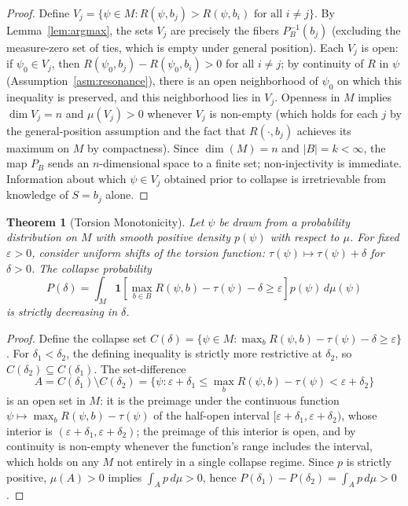 \documentclass[11pt]{article}
\theoremstyle{plain}
\newtheorem{theorem}{Theorem}[section]
\begin{document}
\begin{proof}
Define $V_j = \{\psi \in M : R(\psi, b_j) > R(\psi, b_i) \text{ for all } i \neq j\}$. By
Lemma~\ref{lem:argmax}, the sets $V_j$ are precisely the fibers $P_B^{-1}(b_j)$ (excluding the
measure-zero set of ties, which is empty under general position). Each $V_j$ is open: if
$\psi_0 \in V_j$, then $R(\psi_0, b_j) - R(\psi_0, b_i) > 0$ for all $i \neq j$; by continuity of
$R$ in $\psi$ (Assumption~\ref{asm:resonance}), there is an open neighborhood of $\psi_0$ on which
this inequality is preserved, and this neighborhood lies in $V_j$. Openness in $M$ implies
$\dim V_j = n$ and $\mu(V_j) > 0$ whenever $V_j$ is non-empty (which holds for each $j$ by the
general-position assumption and the fact that $R(\cdot, b_j)$ achieves its maximum on $M$ by
compactness). Since $\dim(M) = n$ and $|B| = k < \infty$, the map $P_B$ sends an $n$-dimensional
space to a finite set; non-injectivity is immediate. Information about which $\psi \in V_j$
obtained prior to collapse is irretrievable from knowledge of $S = b_j$ alone.
\end{proof}

\begin{theorem}[Torsion Monotonicity]\label{thm:monotonicity}
Let $\psi$ be drawn from a probability distribution on $M$ with smooth positive density $p(\psi)$
with respect to $\mu$. For fixed $\varepsilon > 0$, consider uniform shifts of the torsion
function: $\tau(\psi) \mapsto \tau(\psi) + \delta$ for $\delta > 0$. The collapse probability
\[
  P(\delta) = \int_M \mathbf{1}\!\left[ \max_{b \in B} R(\psi, b) - \tau(\psi) - \delta \geq
  \varepsilon \right] p(\psi)\, d\mu(\psi)
\]
is strictly decreasing in $\delta$.
\end{theorem}

\begin{proof}
Define the collapse set
$C(\delta) = \{\psi \in M : \max_b R(\psi, b) - \tau(\psi) - \delta \geq \varepsilon\}$. For
$\delta_1 < \delta_2$, the defining inequality is strictly more restrictive at $\delta_2$, so
$C(\delta_2) \subseteq C(\delta_1)$. The set-difference
\[
  A = C(\delta_1) \setminus C(\delta_2)
  = \{\psi : \varepsilon + \delta_1 \leq \max_b R(\psi, b) - \tau(\psi) < \varepsilon + \delta_2\}
\]
is an open set in $M$: it is the preimage under the continuous function
$\psi \mapsto \max_b R(\psi, b) - \tau(\psi)$ of the half-open interval
$[\varepsilon + \delta_1, \varepsilon + \delta_2)$, whose interior is
$(\varepsilon + \delta_1, \varepsilon + \delta_2)$; the preimage of this interior is open, and by
continuity is non-empty whenever the function's range includes the interval, which holds on any
$M$ not entirely in a single collapse regime. Since $p$ is strictly positive, $\mu(A) > 0$ implies
$\int_A p\, d\mu > 0$, hence $P(\delta_1) - P(\delta_2) = \int_A p\, d\mu > 0$.
\end{proof}
\end{document}
